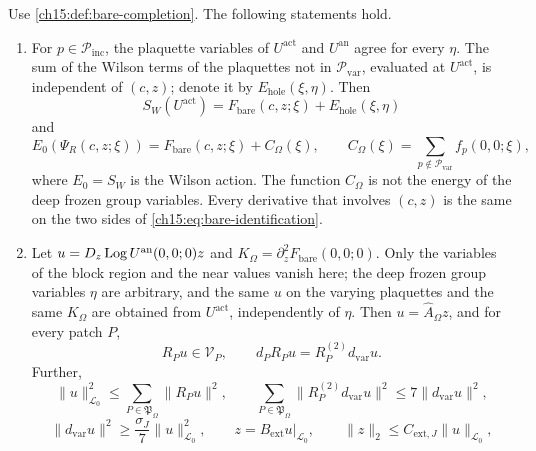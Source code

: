 \begin{lemma}\label{ch15:lem:bare-gap}
Use \cref{ch15:def:bare-completion}. The following statements hold.
\begin{enumerate}
\item For $p\in\mathcal P_{\mathrm{inc}}$, the plaquette variables of $U^{\mathrm{act}}$ and $U^{\mathrm{an}}$ agree for every $\eta$. The sum of the Wilson terms of the plaquettes not in $\mathcal P_{\mathrm{var}}$, evaluated at $U^{\mathrm{act}}$, is independent of $(c,z)$; denote it by $E_{\mathrm{hole}}(\xi,\eta)$. Then
\begin{equation}\label{ch15:eq:bare-split}
 S_W(U^{\mathrm{act}})=F_{\mathrm{bare}}(c,z;\xi)+E_{\mathrm{hole}}(\xi,\eta)
\end{equation}
and
\begin{equation}\label{ch15:eq:bare-identification}
 E_0(\Psi_R(c,z;\xi))
       =F_{\mathrm{bare}}(c,z;\xi)+C_\Omega(\xi),
 \qquad
 C_\Omega(\xi)=\sum_{p\notin\mathcal P_{\mathrm{var}}}
                                      f_p(0,0;\xi),
\end{equation}
where $E_0=S_W$ is the Wilson action. The function $C_\Omega$ is not the energy of the deep frozen group variables. Every derivative that involves $(c,z)$ is the same on the two sides of \eqref{ch15:eq:bare-identification}.
\item Let $u=D_z\operatorname{Log} U^{\mathrm{an}}(0,0;0)z$ and $K_\Omega=\partial_z^2F_{\mathrm{bare}}(0,0;0)$. Only the variables of the block region and the near values vanish here; the deep frozen group variables $\eta$ are arbitrary, and the same $u$ on the varying plaquettes and the same $K_\Omega$ are obtained from $U^{\mathrm{act}}$, independently of $\eta$. Then $u=\widehat A_\Omega z$, and for every patch $P$,
\begin{equation}\label{ch15:eq:bare-restriction}
 R_Pu\in\mathcal V_P,\qquad
 d_PR_Pu=R_P^{(2)}d_{\mathrm{var}}u .
\end{equation}
Further,
\begin{equation}\label{ch15:eq:bare-cover}
 \|u\|_{\mathcal L_0}^2\le\sum_{P\in\mathfrak P_\Omega}\|R_Pu\|^2,
 \qquad
 \sum_{P\in\mathfrak P_\Omega}
       \|R_P^{(2)}d_{\mathrm{var}}u\|^2
                        \le7\|d_{\mathrm{var}}u\|^2,
\end{equation}
\begin{equation}\label{ch15:eq:bare-coercive}
 \|d_{\mathrm{var}}u\|^2\ge\frac{\sigma_J}7\|u\|_{\mathcal L_0}^2,
 \qquad z=B_{\mathrm{ext}}u|_{\mathcal L_0},\qquad
 \|z\|_2\le C_{\mathrm{ext},J}\|u\|_{\mathcal L_0},

\end{equation}
\end{enumerate}
\end{lemma}
